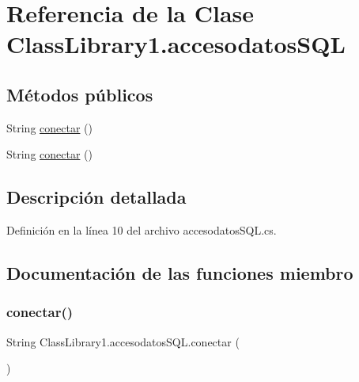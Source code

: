 \hypertarget{class_class_library1_1_1accesodatos_s_q_l}{}\section{Referencia de la Clase Class\+Library1.\+accesodatos\+S\+QL}
\label{class_class_library1_1_1accesodatos_s_q_l}
\subsection*{Métodos públicos}
\begin{DoxyCompactItemize}
\item 
String \mbox{\hyperlink{class_class_library1_1_1accesodatos_s_q_l_af4cf2282dce1337ba32541e38c0fd515}{conectar}} ()
\item 
String \mbox{\hyperlink{class_class_library1_1_1accesodatos_s_q_l_af4cf2282dce1337ba32541e38c0fd515}{conectar}} ()
\end{DoxyCompactItemize}


\subsection{Descripción detallada}


Definición en la línea 10 del archivo accesodatos\+S\+Q\+L.\+cs.



\subsection{Documentación de las funciones miembro}
\mbox{\label{class_class_library1_1_1accesodatos_s_q_l_af4cf2282dce1337ba32541e38c0fd515}} 
\subsubsection{\texorpdfstring{conectar()}{conectar()}\hspace{0.1cm}{\footnotesize\ttfamily [1/2]}}
{\footnotesize\ttfamily String Class\+Library1.\+accesodatos\+S\+Q\+L.\+conectar (\begin{DoxyParamCaption}{ }\end{DoxyParamCaption})}



